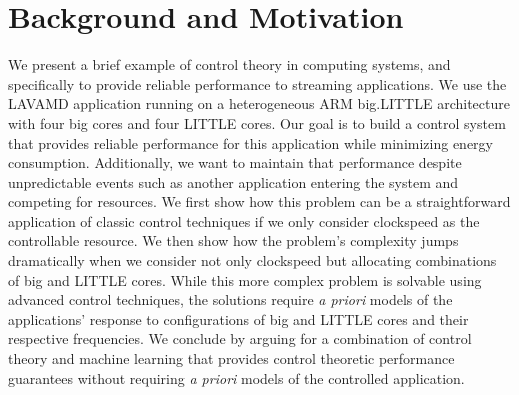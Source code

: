 \section{Background and Motivation}
\label{sec:example}
We present a brief example of control theory in computing systems, and
specifically to provide reliable performance to streaming applications.
We use the LAVAMD application running on a heterogeneous ARM
big.LITTLE architecture with four big cores and four LITTLE cores.
Our goal is to build a control system that provides reliable
performance for this application while minimizing energy consumption.
Additionally, we want to maintain that performance despite
unpredictable events such as another application entering the system
and competing for resources.  We first show how this problem can be a
straightforward application of classic control techniques if we only
consider clockspeed as the controllable resource.  We then show how the
problem's complexity jumps dramatically when we consider not only
clockspeed but allocating combinations of big and LITTLE cores.  While
this more complex problem is solvable using advanced control
techniques, the solutions require {\em a priori} models of the
applications' response to configurations of big and LITTLE cores and
their respective frequencies.  We conclude by arguing for a
combination of control theory and machine learning that provides
control theoretic performance guarantees without requiring {\em a
  priori} models of the controlled application.

